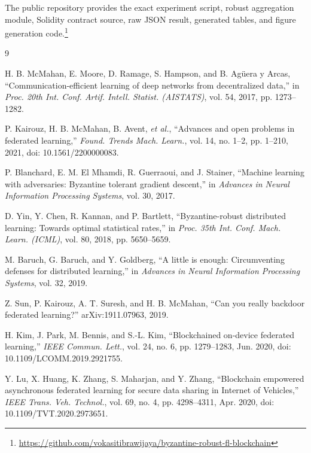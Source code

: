 \documentclass[10pt,letterpaper]{article}
\begin{document}
The public repository provides the exact experiment script, robust aggregation
module, Solidity contract source, raw JSON result, generated tables, and figure
generation code.\footnote{\url{https://github.com/vokasitibrawijaya/byzantine-robust-fl-blockchain}}

\small
\begin{thebibliography}{9}

H. B. McMahan, E. Moore, D. Ramage, S. Hampson, and B. Ag\"uera y Arcas,
``Communication-efficient learning of deep networks from decentralized data,''
in \emph{Proc. 20th Int. Conf. Artif. Intell. Statist. (AISTATS)}, vol. 54,
2017, pp. 1273--1282.

P. Kairouz, H. B. McMahan, B. Avent, \emph{et al.},
``Advances and open problems in federated learning,''
\emph{Found. Trends Mach. Learn.}, vol. 14, no. 1--2, pp. 1--210, 2021,
doi: 10.1561/2200000083.

P. Blanchard, E. M. El Mhamdi, R. Guerraoui, and J. Stainer,
``Machine learning with adversaries: Byzantine tolerant gradient descent,''
in \emph{Advances in Neural Information Processing Systems}, vol. 30, 2017.

D. Yin, Y. Chen, R. Kannan, and P. Bartlett,
``Byzantine-robust distributed learning: Towards optimal statistical rates,''
in \emph{Proc. 35th Int. Conf. Mach. Learn. (ICML)}, vol. 80, 2018,
pp. 5650--5659.

M. Baruch, G. Baruch, and Y. Goldberg,
``A little is enough: Circumventing defenses for distributed learning,''
in \emph{Advances in Neural Information Processing Systems}, vol. 32, 2019.

Z. Sun, P. Kairouz, A. T. Suresh, and H. B. McMahan,
``Can you really backdoor federated learning?''
arXiv:1911.07963, 2019.

H. Kim, J. Park, M. Bennis, and S.-L. Kim,
``Blockchained on-device federated learning,''
\emph{IEEE Commun. Lett.}, vol. 24, no. 6, pp. 1279--1283, Jun. 2020,
doi: 10.1109/LCOMM.2019.2921755.

Y. Lu, X. Huang, K. Zhang, S. Maharjan, and Y. Zhang,
``Blockchain empowered asynchronous federated learning for secure data sharing
in Internet of Vehicles,''
\emph{IEEE Trans. Veh. Technol.}, vol. 69, no. 4, pp. 4298--4311, Apr. 2020,
doi: 10.1109/TVT.2020.2973651.

\end{thebibliography}
\end{document}
